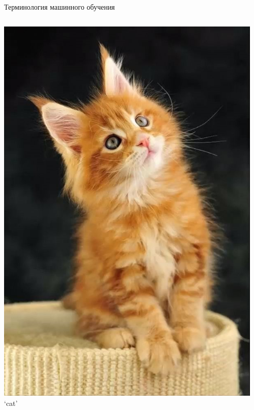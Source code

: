 \documentclass[aspectratio=169, professionalfonts]{beamer}
\begin{document}
\begin{frame}{Терминология машинного обучения}
\begin{columns}
\begin{column}{.1\linewidth}
            \includegraphics[width=\linewidth]{graphs/fig17_6.jpg}
            `cat'
        \end{column}
        \begin{column}{.1\linewidth}
            \centering

\end{column}
\end{columns}
\end{frame}
\end{document}
